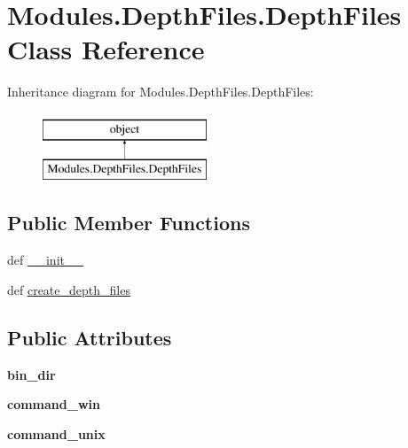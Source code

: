 \hypertarget{classModules_1_1DepthFiles_1_1DepthFiles}{\section{Modules.\-Depth\-Files.\-Depth\-Files Class Reference}
\label{classModules_1_1DepthFiles_1_1DepthFiles}
}
Inheritance diagram for Modules.\-Depth\-Files.\-Depth\-Files\-:\begin{figure}[H]
\begin{center}
\leavevmode
\includegraphics[height=2.000000cm]{classModules_1_1DepthFiles_1_1DepthFiles}
\end{center}
\end{figure}
\subsection*{Public Member Functions}
\begin{DoxyCompactItemize}
\item 
def \hyperlink{classModules_1_1DepthFiles_1_1DepthFiles_a1b9bf9c184949775ff1cf8372f2dc3d6}{\-\_\-\-\_\-init\-\_\-\-\_\-}
\item 
def \hyperlink{classModules_1_1DepthFiles_1_1DepthFiles_ac5e61061ced613567796cfc7e84e13af}{create\-\_\-depth\-\_\-files}
\end{DoxyCompactItemize}
\subsection*{Public Attributes}
\begin{DoxyCompactItemize}
\item 
\hypertarget{classModules_1_1DepthFiles_1_1DepthFiles_ac3281cfac36e109a357d5ce6b810cded}{{\bfseries bin\-\_\-dir}}\label{classModules_1_1DepthFiles_1_1DepthFiles_ac3281cfac36e109a357d5ce6b810cded}

\item 
\hypertarget{classModules_1_1DepthFiles_1_1DepthFiles_a2d177607b373b564c2285acede124a6f}{{\bfseries command\-\_\-win}}\label{classModules_1_1DepthFiles_1_1DepthFiles_a2d177607b373b564c2285acede124a6f}

\item 
\hypertarget{classModules_1_1DepthFiles_1_1DepthFiles_a030a740044fd055eeb09223ac3a75d69}{{\bfseries command\-\_\-unix}}\label{classModules_1_1DepthFiles_1_1DepthFiles_a030a740044fd055eeb09223ac3a75d69}

\end{DoxyCompactItemize}


